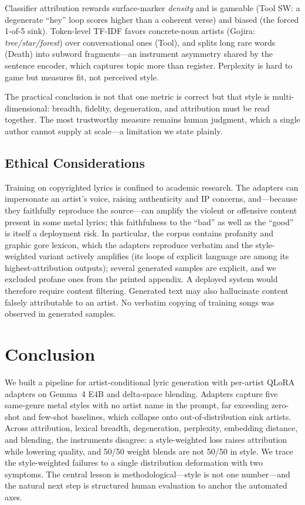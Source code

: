 \documentclass[runningheads]{llncs}
\begin{document}
Classifier attribution rewards surface-marker \emph{density} and is gameable (Tool SW: a degenerate ``hey'' loop scores higher than a coherent verse) and biased (the forced 1-of-5 sink). Token-level TF-IDF favors concrete-noun artists (Gojira: \emph{tree/star/forest}) over conversational ones (Tool), and splits long rare words (Death) into subword fragments---an instrument asymmetry shared by the sentence encoder, which captures topic more than register. Perplexity is hard to game but measures fit, not perceived style.

The practical conclusion is not that one metric is correct but that style is multi-dimensional: breadth, fidelity, degeneration, and attribution must be read together. The most trustworthy measure remains human judgment, which a single author cannot supply at scale---a limitation we state plainly.

\subsection{Ethical Considerations}
Training on copyrighted lyrics is confined to academic research. The adapters can impersonate an artist's voice, raising authenticity and IP concerns, and---because they faithfully reproduce the source---can amplify the violent or offensive content present in some metal lyrics; this faithfulness to the ``bad'' as well as the ``good'' is itself a deployment risk. In particular, the corpus contains profanity and graphic gore lexicon, which the adapters reproduce verbatim and the style-weighted variant actively amplifies (its loops of explicit language are among its highest-attribution outputs); several generated samples are explicit, and we excluded profane ones from the printed appendix. A deployed system would therefore require content filtering. Generated text may also hallucinate content falsely attributable to an artist. No verbatim copying of training songs was observed in generated samples.

\section{Conclusion}
\label{sec:conclusion}
We built a pipeline for artist-conditional lyric generation with per-artist QLoRA adapters on Gemma~4 E4B and delta-space blending. Adapters capture five same-genre metal styles with no artist name in the prompt, far exceeding zero-shot and few-shot baselines, which collapse onto out-of-distribution sink artists. Across attribution, lexical breadth, degeneration, perplexity, embedding distance, and blending, the instruments disagree: a style-weighted loss raises attribution while lowering quality, and 50/50 weight blends are not 50/50 in style. We trace the style-weighted failures to a single distribution deformation with two symptoms. The central lesson is methodological---style is not one number---and the natural next step is structured human evaluation to anchor the automated axes.
\end{document}
